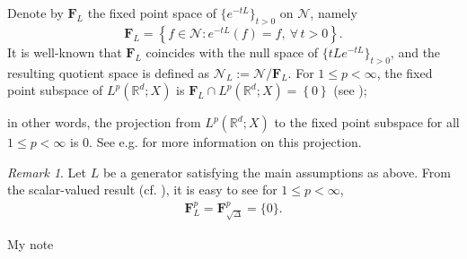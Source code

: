 \documentclass[oneside,english,a4wide]{amsart}
\numberwithin{equation}{section}
\numberwithin{figure}{section}
\theoremstyle{plain}
\theoremstyle{plain}
\theoremstyle{definition}
\theoremstyle{plain}
\theoremstyle{remark}
\theoremstyle{definition}
\theoremstyle{remark}
\newtheorem{remark}[thm]{Remark}
\theoremstyle{definition}
\newcommand{\real}{{\mathbb R}}
\newcommand{\N}{{\mathcal N}}
\newcommand{\8}{+\infty}
\renewcommand{\1}{\mathbbm{1}}
\newcommand\lk[1]{ \left\{ #1 \right\} }
\begin{document}
Denote by $\mathbf{F}_L$ the fixed point space of $\{e^{-tL}\}_{t>0}$ on $\N$, namely
\[
    \mathbf{F}_L = \lk{ f \in \N: e^{-tL}(f) = f,\ \forall\, t > 0}.
\]
It is well-known that $\mathbf{F}_L$ coincides with the null space of $\{tLe^{-tL}\}_{t>0}$, and the resulting quotient space is defined as $\N_L := \N / \mathbf{F}_L$. For $1\leq p<\infty$, the fixed point subspace of $L^p(\real^d; X)$ is $\mathbf{F}_L\cap L^p(\real ^d; X) = \lk{0}$ (see \cite[Theorem 6.10]{DXT}); {in other words, the projection from $L^p(\real ^d; X)$ to the fixed point subspace for all $1\leq p<\infty$ is $0$. See e.g. \cite{MTX, Xu2021} for more information on this projection. 

\iffalse
\begin{remark}\label{rk:fixedpoint}
Let $L$ be a generator satisfying the main assumptions as above. From the scalar-valued result (cf. \cite[Theorem 6.10]{DXT}), it is easy to see for $1\leq p<\infty$,
\begin{align}\label{fixedpoint}
\mathbf{F}^p_L=\mathbf{F}^p_{\sqrt{\Delta}}=\{0\}.
\end{align}
\end{remark}

{\color{blue}My note

}}
\end{document}
